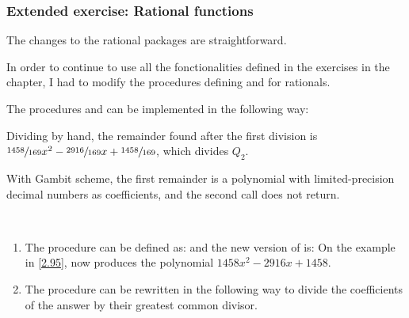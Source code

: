 \subsubsection{Extended exercise: Rational functions}

\begin{exe}[2.93]
    The changes to the rational packages are straightforward.

    \begin{comp}
        In order to continue to use all the fonctionalities defined in the 
        exercises in the chapter, I had to modify the procedures defining 
         and  for rationals.
    \end{comp}
\end{exe}

\begin{exe}[2.94]
    The procedures  and  can be implemented 
    in the following way:
\end{exe}

\begin{exe}[2.95]
    \label{2.95}
    Dividing by hand, the remainder found after the first division is
    $\sfrac{1458}{169} x^2 - \sfrac{2916}{169} x + \sfrac{1458}{169}$, which 
    divides $Q_2$.

    With Gambit scheme, the first remainder is a polynomial with 
    limited-precision decimal numbers as coefficients, and the second call does not 
    return.
\end{exe}

\begin{exe}[2.96]
    \ \vspace{-20pt}
    \begin{enumerate}
        \item The procedure  can be defined as:
            and the new version of  is:
	    On the example in \autoref{2.95},  now 
	    produces the polynomial $1458 x^2 - 2916 x + 1458$.
        \item The procedure can be rewritten in the following way to divide the 
            coefficients of the answer by their greatest common divisor.
    \end{enumerate}
\end{exe}

